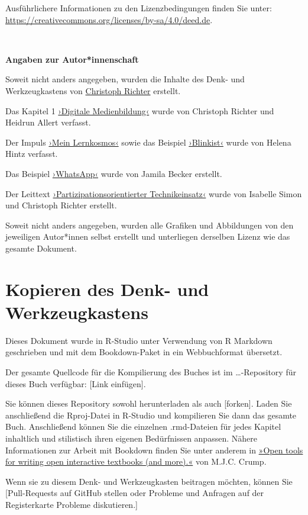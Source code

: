 \documentclass[
  a4paper,
]{book}
\begin{document}
Ausführlichere Informationen zu den Lizenzbedingungen finden Sie unter: \url{https://creativecommons.org/licenses/by-sa/4.0/deed.de}.

~

\textbf{Angaben zur Autor*innenschaft}

Soweit nicht anders angegeben, wurden die Inhalte des Denk- und Werkzeugkastens von \href{Mailto:richter@paedagogik.uni-kiel.de}{Christoph Richter} erstellt.

Das Kapitel 1 \hyperref[digitale-medienbildung]{›Digitale Medienbildung‹} wurde von Christoph Richter und Heidrun Allert verfasst.

Der Impuls \hyperref[mein-lernkosmos]{›Mein Lernkosmos‹} sowie das Beispiel \hyperref[beispiel-blinkist]{›Blinkist‹} wurde von Helena Hintz verfasst.

Das Beispiel \hyperref[beispiel-whatsapp]{›WhatsApp‹} wurde von Jamila Becker erstellt.

Der Leittext \hyperref[partizipationsorientierter-technikeinsatz]{›Partizipationsorientierter Technikeinsatz‹} wurde von Isabelle Simon und Christoph Richter erstellt.

Soweit nicht anders angegeben, wurden alle Grafiken und Abbildungen von den jeweiligen Autor*innen selbst erstellt und unterliegen derselben Lizenz wie das gesamte Dokument.

\section{Kopieren des Denk- und Werkzeugkastens}\label{kopieren-des-denk--und-werkzeugkastens}

Dieses Dokument wurde in R-Studio unter Verwendung von R Markdown geschrieben und mit dem Bookdown-Paket in ein Webbuchformat übersetzt.

Der gesamte Quellcode für die Kompilierung des Buches ist im \ldots-Repository für dieses Buch verfügbar: {[}Link einfügen{]}.

Sie können dieses Repository sowohl herunterladen als auch {[}forken{]}. Laden Sie anschließend die Rproj-Datei in R-Studio und kompilieren Sie dann das gesamte Buch. Anschließend können Sie die einzelnen .rmd-Dateien für jedes Kapitel inhaltlich und stilistisch ihren eigenen Bedürfnissen anpassen. Nähere Informationen zur Arbeit mit Bookdown finden Sie unter anderem in \href{https://www.crumplab.com/OER_bookdown/}{»Open tools for writing open interactive textbooks (and more).«} von M.J.C. Crump.

Wenn sie zu diesem Denk- und Werkzeugkasten beitragen möchten, können Sie {[}Pull-Requests auf GitHub stellen oder Probleme und Anfragen auf der Registerkarte Probleme diskutieren.{]}
\end{document}
